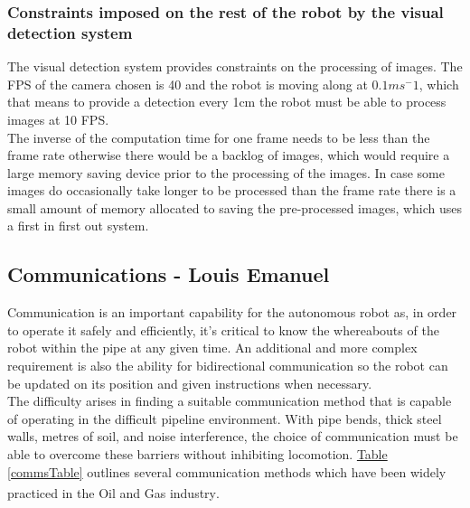 \documentclass[11pt]{article}		%
\newcommand{\supercite}[1]{\textsuperscript{\cite{#1}}}		%
\newcommand{\tableref}[1]{\hyperref[#1]{Table \ref*{#1}}}     %
\begin{document}
	        \subsubsection{Constraints imposed on the rest of the robot by the visual detection system}
	        The visual detection system provides constraints on the processing of images. The FPS of the camera chosen is 40 and the robot is moving along at $0.1ms^-1$, which that means to  provide a detection every 1cm the robot must be able to process images at 10 FPS.
	        \\
	        The inverse of the computation time for one frame needs to be less than the frame rate otherwise there would be a backlog of images, which would require a large memory saving device prior to the processing of the images. 
	        In case some images do occasionally take longer to be processed than the frame rate there is a small amount of memory allocated to saving the pre-processed images, which uses a first in first out system.

		\subsection[Communications]{Communications - Louis Emanuel}

			Communication is an important capability for the autonomous robot as, in order to operate it safely and efficiently, it's critical to know the whereabouts of the robot within the pipe at any given time. 
			An additional and more complex requirement is also the ability for bidirectional communication so the robot can be updated on its position and given instructions when necessary. 
			\\
		    The difficulty arises in finding a suitable communication method that is capable of operating in the difficult pipeline environment. 
		    With pipe bends, thick steel walls, metres of soil, and noise interference, the choice of communication must be able to overcome these barriers without inhibiting locomotion. 
		    \tableref{commsTable} outlines several communication methods which have been widely practiced in the Oil and Gas industry\supercite{acoustic2020}.
		    \\
		    
\end{document}
